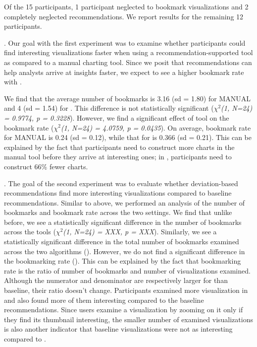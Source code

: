  Of the 15 participants, 1 participant neglected to bookmark visualizations and 2 completely
 neglected recommendations. 
 We report results for the remaining 12 participants.

 .
 Our goal with the first experiment was to examine whether participants could find interesting 
 visualizations faster when using a recommendation-supported tool as compared to a manual charting tool.
 Since we posit that recommendations can help analysts arrive at insights faster,
 we expect to see a higher bookmark rate with \SeeDB.
 
 We find that the average number of bookmarks is 3.16 (sd = 1.80)
 for MANUAL and 4 (sd = 1.54) for \SeeDB.
 This difference is not statistically significant ({\em $\chi^2$(1, N=24) = 0.9774,
 p = 0.3228}).
 However, we find a significant effect of tool on the bookmark rate ({\em $\chi^2$(1, N=24) = 4.0759,
 p = 0.0435}).
 On average, bookmark rate for MANUAL is 0.24 (sd = 0.12), while that for \SeeDB is 0.366 (sd = 0.21).
 This can be explained by the fact that participants need to construct more charts in the manual tool
 before they arrive at interesting ones; in \SeeDB, participants need to construct 66\% fewer charts.

 .
 The goal of the second experiment was to evaluate whether deviation-based recommendations find more
 interesting visualizations compared to baseline recommendations.
 Similar to above, we performed an analysis of the number of bookmarks and bookmark rate across
 the two settings.
 We find that unlike before, we see a statistically significant difference in the number of bookmarks
 across the tools ({\em $\chi^2$(1, N=24) = XXX, p = XXX}).
 Similarly, we see a statistically significant difference in the total number of bookmarks examined 
 across the two algorithms ().
 However, we do not find a significant difference in the bookmarking rate ().
 This can be explained by the fact that bookmarking rate is the ratio of number of bookmarks and number
 of visualizations examined.
 Although the numerator and denominator are respectively larger for \SeeDB than baseline, their ratio
 doesn't change.
 Participants examined more visualization in \SeeDB and also found more of them interesting compared to the 
 baseline recommendations. 
 Since users examine a visualization by zooming on it only if they find its thumbnail interesting,
 the smaller number of examined visualizations is also another indicator that baseline visualizations
 were not as interesting compared to \SeeDB.

